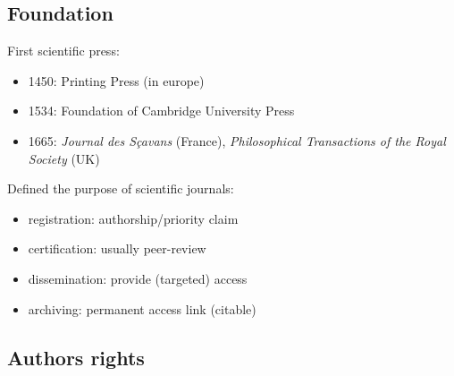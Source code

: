 \documentclass[10pt,compress,serif,aspectratio=169]{beamer}
\begin{document}
\subsection{Foundation}
\begin{frame}[t]%
 \vskip1cm%

{\large First scientific press:\newline}
 
 \begin{itemize}


 \item 1450: Printing Press (in europe)
 \item 1534: Foundation of Cambridge University Press
 \item 1665: \textit{Journal des Sçavans} (France), \textit{Philosophical Transactions of the Royal Society} (UK)\\
 \end{itemize}

 \vfill
 \pause
{\large Defined the purpose of scientific journals:\newline}

\begin{itemize}
\item registration: authorship/priority claim
\item certification: usually peer-review
\item dissemination: provide (targeted) access
\item archiving: permanent access link (citable) 
\end{itemize}
\end{frame}

\subsection{Authors rights}
\end{document}
